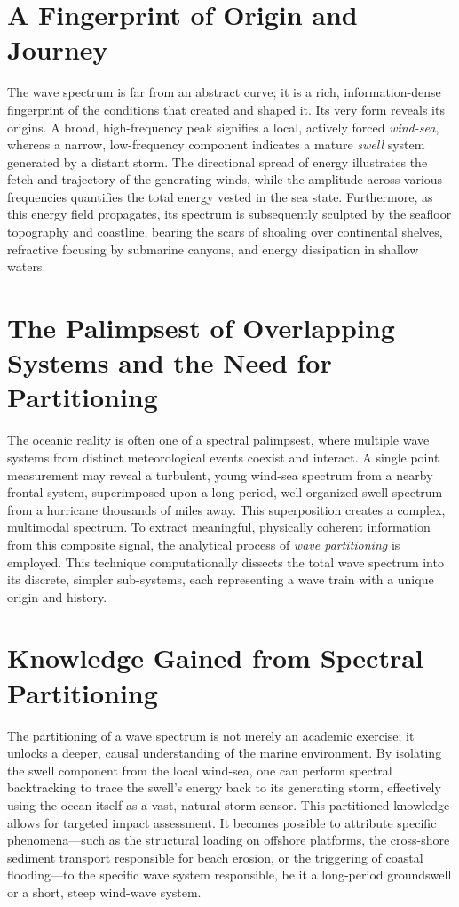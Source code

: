 \documentclass[11pt,letterpaper]{article}
\begin{document}
\section{A Fingerprint of Origin and Journey}

The wave spectrum is far from an abstract curve; it is a rich, information-dense fingerprint of the conditions that created and shaped it. Its very form reveals its origins. A broad, high-frequency peak signifies a local, actively forced \textit{wind-sea}, whereas a narrow, low-frequency component indicates a mature \textit{swell} system generated by a distant storm. The directional spread of energy illustrates the fetch and trajectory of the generating winds, while the amplitude across various frequencies quantifies the total energy vested in the sea state. Furthermore, as this energy field propagates, its spectrum is subsequently sculpted by the seafloor topography and coastline, bearing the scars of shoaling over continental shelves, refractive focusing by submarine canyons, and energy dissipation in shallow waters.

\section{The Palimpsest of Overlapping Systems and the Need for Partitioning}

The oceanic reality is often one of a spectral palimpsest, where multiple wave systems from distinct meteorological events coexist and interact. A single point measurement may reveal a turbulent, young wind-sea spectrum from a nearby frontal system, superimposed upon a long-period, well-organized swell spectrum from a hurricane thousands of miles away. This superposition creates a complex, multimodal spectrum. To extract meaningful, physically coherent information from this composite signal, the analytical process of \textit{wave partitioning} is employed. This technique computationally dissects the total wave spectrum into its discrete, simpler sub-systems, each representing a wave train with a unique origin and history.

\section{Knowledge Gained from Spectral Partitioning}

The partitioning of a wave spectrum is not merely an academic exercise; it unlocks a deeper, causal understanding of the marine environment. By isolating the swell component from the local wind-sea, one can perform spectral backtracking to trace the swell's energy back to its generating storm, effectively using the ocean itself as a vast, natural storm sensor. This partitioned knowledge allows for targeted impact assessment. It becomes possible to attribute specific phenomena—such as the structural loading on offshore platforms, the cross-shore sediment transport responsible for beach erosion, or the triggering of coastal flooding—to the specific wave system responsible, be it a long-period groundswell or a short, steep wind-wave system.
\end{document}

